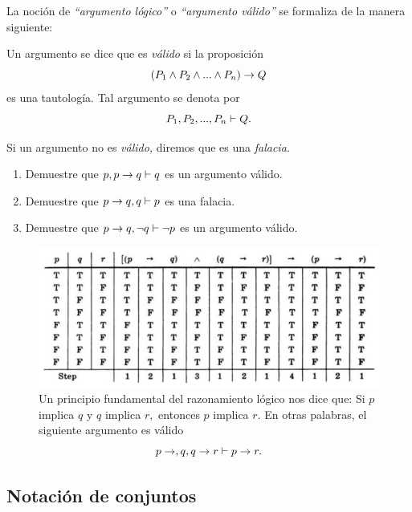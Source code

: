  La noción de \emph{``argumento lógico''} o \emph{``argumento válido''} se formaliza de la manera siguiente:
 
 \begin{definicion}
  \label{lip:4.4}
  Un argumento se dice que es \emph{válido} si la proposición 
  $$
  \left( P_{1} \wedge P_{2} \wedge...\wedge P_{n}\right) \rightarrow Q
  $$ es una tautología. 
  Tal argumento se denota por $$P_{1}, P_{2},...,P_{n} \vdash Q.$$
  
   Si un argumento no es \emph{válido,} diremos que es una \emph{falacia.}
 \end{definicion}




 \begin{problema}
 \label{lip:exmp:4.4}
  \begin{enumerate}
   \item Demuestre que $p, p\rightarrow q \vdash q$ es un argumento válido. 
   \item Demuestre que $p\rightarrow q, q \vdash p$ es una falacia.
   
   \item Demuestre que $p\rightarrow q, \neg q \vdash \neg p$ es un argumento válido.
  \end{enumerate}

 \end{problema}

	\begin{figure}
		\centering
		\includegraphics[width=0.7\linewidth]{md/tabla_silogismo}
		\caption{
			  Un principio fundamental del razonamiento lógico nos dice que:
				Si $p$ implica $q$ y $q$ implica $r,$ entonces $p$ implica $r.$ 
			En otras palabras, el siguiente argumento es válido
			$$
			p\rightarrow,q, q\rightarrow r \vdash p \rightarrow r.
			$$ }
		\label{fig:tabla_silogismo}
	\end{figure}

\subsection{Notación de conjuntos}

